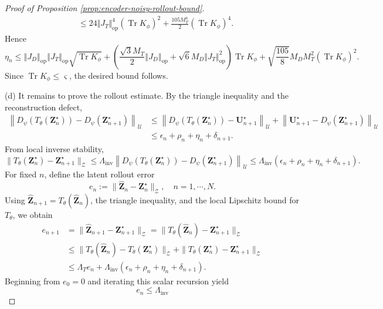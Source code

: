 \documentclass[11pt]{article}
\begin{document}
\begin{proof}[Proof of Proposition \ref{prop:encoder-noisy-rollout-bound}]
\begin{align*}
    &\leq 24\Vert J_T\Vert_\mathrm{op}^4(\operatorname{Tr} K_\phi)^2+\frac{105 M_T^4}{2}(\operatorname{Tr} K_\phi)^4.
\end{align*}
Hence
\begin{equation*}
    \eta_n\leq \left\Vert J_D\right\Vert_\mathrm{op}\left\Vert J_T\right\Vert_\mathrm{op}\sqrt{\operatorname{Tr}K_\phi}+\left(\frac{\sqrt{3}M_T}{2}\left\Vert J_D\right\Vert_\mathrm{op}+\sqrt{6}M_D\Vert J_T\Vert_\mathrm{op}^2\right)\operatorname{Tr}K_\phi+\sqrt{\frac{105}{8}}M_DM_T^2(\operatorname{Tr} K_\phi)^2.
\end{equation*}
Since $\operatorname{Tr} K_\phi\leq \varsigma$, the desired bound follows.

\item (d) It remains to prove the rollout estimate. By the triangle inequality and the reconstruction defect,
\[
\begin{aligned}
\left\|
D_\psi(T_\theta(\mathbf Z_n^\star))-D_\psi(\mathbf Z_{n+1}^\star)
\right\|_{\mathcal U}
&\le
\left\|
D_\psi(T_\theta(\mathbf Z_n^\star))-\mathbf  U^\star_{n+1}
\right\|_{\mathcal U}
+
\left\|
\mathbf U^\star_{n+1}-D_\psi(\mathbf Z_{n+1}^\star)
\right\|_{\mathcal U} \\
&\le\epsilon_n+\rho_n+\eta_n+\delta_{n+1}.
\end{aligned}
\] 
From local inverse stability,
\[
\|T_\theta(\mathbf Z_n^\star)-\mathbf Z_{n+1}^\star\|_{\mathcal Z}\le\Lambda_{\mathrm{inv}}\left\|D_\psi(T_\theta(\mathbf Z_n^\star))-D_\psi(\mathbf Z_{n+1}^\star)\right\|_{\mathcal U}\le\Lambda_{\mathrm{inv}}\left(\epsilon_n+\rho_n+\eta_n+\delta_{n+1}\right).
\]
For fixed $n$, define the latent rollout error
\[
e_n := \|\widehat{\mathbf Z}_n-\mathbf Z_n^\star\|_{\mathcal Z},\quad n=1,\cdots,N.
\]
Using $\widehat{\mathbf Z}_{n+1}=T_\theta(\widehat{\mathbf Z}_n)$, the triangle inequality, and the local Lipschitz bound for $T_\theta$, we obtain
\[
\begin{aligned}
e_{n+1}
&=
\|\widehat{\mathbf Z}_{n+1}-\mathbf Z_{n+1}^\star\|_{\mathcal Z} =
\|T_\theta(\widehat{\mathbf Z}_n)-\mathbf Z_{n+1}^\star\|_{\mathcal Z} \\
&\le
\|T_\theta(\widehat{\mathbf Z}_n)-T_\theta(\mathbf Z_n^\star)\|_{\mathcal Z}
+
\|T_\theta(\mathbf Z_n^\star)-\mathbf Z_{n+1}^\star\|_{\mathcal Z} \\
&\le
\Lambda_T e_n
+
\Lambda_{\mathrm{inv}}
\left(
\epsilon_n+\rho_n+\eta_n+\delta_{n+1}
\right).
\end{aligned}
\]
Beginning from $e_0=0$ and iterating this scalar recursion yield
\[
e_n\le\Lambda_{\mathrm{inv}}
\]
\end{proof}
\end{document}
